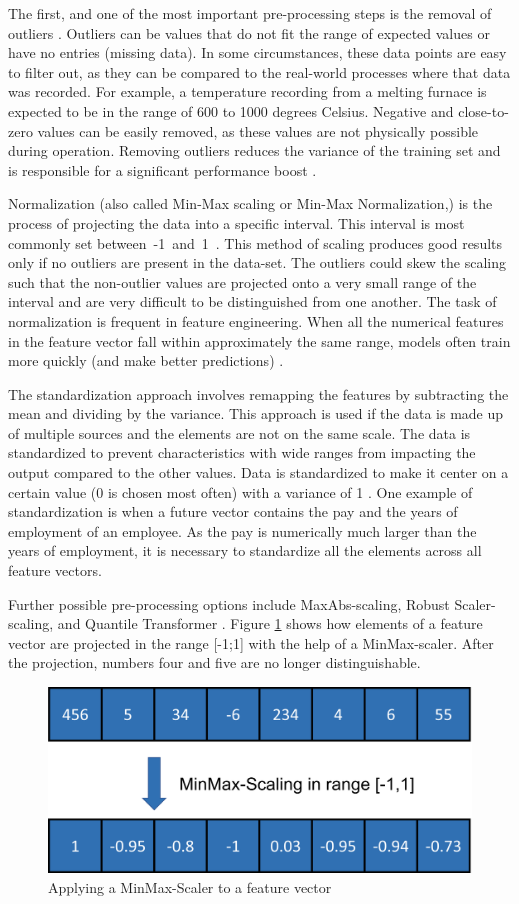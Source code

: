 The first, and one of the most important pre-processing steps is the removal of outliers \cite{Yang}. Outliers can be values that do not fit the range of expected values or have no entries (missing data). In some circumstances, these data points are easy to filter out, as they can be compared to the real-world processes where that data was recorded. For example, a temperature recording from a melting furnace is expected to be in the range of 600 to 1000 degrees Celsius. Negative and close-to-zero values can be easily removed, as these values are not physically possible during operation. Removing outliers reduces the variance of the training set and is responsible for a significant performance boost \cite{Li}.

Normalization (also called Min-Max scaling or Min-Max Normalization,) is the process of projecting the data into a specific interval. This interval is most commonly set between~-1~and~1~\cite{Peshawa}. This method of scaling produces good results only if no outliers are present in the data-set. The outliers could skew the scaling such that the non-outlier values are projected onto a very small range of the interval and are very difficult to be distinguished from one another. The task of normalization is frequent in feature engineering. When all the numerical features in the feature vector fall within approximately the same range, models often train more quickly (and make better predictions) \cite{Jayalakshmi}.

The standardization approach involves remapping the features by subtracting the mean and dividing by the variance. This approach is used if the data is made up of multiple sources and the elements are not on the same scale. The data is standardized to prevent characteristics with wide ranges from impacting the output compared to the other values. Data is standardized to make it center on a certain value (0 is chosen most often) with a variance of 1 \cite{Raju}.
One example of standardization is when a future vector contains the pay and the years of employment of an employee. As the pay is numerically much larger than the years of employment, it is necessary to standardize all the elements across all feature vectors. 

Further possible pre-processing options include MaxAbs-scaling, Robust Scaler-scaling, and Quantile Transformer \cite{Ahsan}.
Figure \ref{fig:MM} shows how elements of a feature vector are projected in the range [-1;1] with the help of a MinMax-scaler. After the projection, numbers four and five are no longer distinguishable. 
\begin{figure}[H]
	\centering
	\includegraphics[width=0.6\linewidth]{IMGs/MM.png}
	\caption{Applying a MinMax-Scaler to a feature vector}
	\label{fig:MM}
\end{figure}


